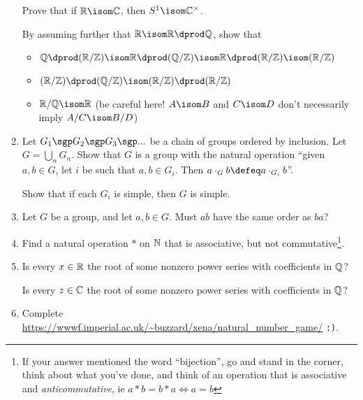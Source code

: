 \documentclass[a4paper,12pt]{article}
\begin{document}
\begin{enumerate}
  Prove that if \(\R \isom \C\), then \(S^1 \isom \C^\times\).

  By assuming further that \(\R \isom \R \dprod \Q\), show that
  \begin{itemize}
   \item
    \(\Q \dprod (\R/\Z) \isom \R \dprod (\Q/\Z) \isom
      \R \dprod (\R/\Z) \isom (\R/\Z)\)
   \item
    \((\R/\Z) \dprod (\Q/\Z) \isom (\R/\Z) \dprod (\R/\Z)\)
   \item
    \(\R/\Q \isom \R\)
    (be careful here! \(A \isom B\) and \(C \isom D\) don't necessarily imply
    \(A/C \isom B/D\))
  \end{itemize}
 \item
  Let \(G_1 \sgp G_2 \sgp G_3 \sgp ...\) be a chain of groups ordered by
  inclusion. Let \(G = \bigcup_n G_n\). Show that \(G\) is a group with the
  natural operation ``given \(a, b \in G\), let \(i\) be such that
  \(a, b \in G_i\). Then \(a \cdot_G b \defeq a \cdot_{G_i} b\)''.

  Show that if each \(G_i\) is simple, then \(G\) is simple.
 \item
  Let \(G\) be a group, and let \(a, b \in G\). Must \(ab\) have the same order
  as \(ba\)?
 \item
  Find a natural operation \(\ast\) on \(\mathbb N\) that is associative, but not
  commutative\footnote{If your answer mentioned the word ``bijection'', go and
  stand in the corner, think about what you've done, and think of an operation
  that is associative and \emph{anticommutative}, ie
  \(a \ast b = b \ast a \iff a = b\)}.
 \item
  Is every \(x \in \mathbb R\) the root of some nonzero power series with coefficients
  in \(\mathbb Q\)?

  Is every \(z \in \mathbb C\) the root of some nonzero power series with coefficients
  in \(\mathbb Q\)?
 \item
  Complete \url{https://wwwf.imperial.ac.uk/~buzzard/xena/natural_number_game/}
  \texttt{:)}.


\end{enumerate}
\end{document}
